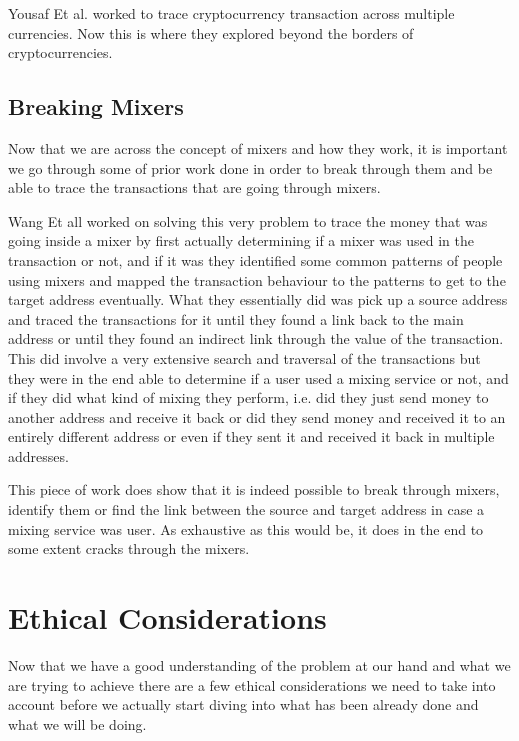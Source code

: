 \documentclass{article}
\begin{document}
        Yousaf Et al.\cite{tracing_transactions_across_cryptocurrency_ledgers_-_usenix} worked to trace cryptocurrency transaction across multiple currencies. Now this is where they explored beyond the borders of cryptocurrencies. 
        
\pagebreak

    \subsection{Breaking Mixers}
        Now that we are across the concept of mixers and how they work, it is important we go through some of prior work done in order to break through them and be able to trace the transactions that are going through mixers. 
        
        Wang Et all \cite{wang2022zero} worked on solving this very problem to trace the money that was going inside a mixer by first actually determining if a mixer was used in the transaction or not, and if it was they identified some common patterns of people using mixers and mapped the transaction behaviour to the patterns to get to the target address eventually. What they essentially did was pick up a source address and traced the transactions for it until they found a link back to the main address or until they found an indirect link through the value of the transaction. This did involve a very extensive search and traversal of the transactions but they were in the end able to determine if a user used a mixing service or not, and if they did what kind of mixing they perform, i.e. did they just send money to another address and receive it back or did they send money and received it to an entirely different address or even if they sent it and received it back in multiple addresses.
        
        This piece of work does show that it is indeed possible to break through mixers, identify them or find the link between the source and target address in case a mixing service was user. As exhaustive as this would be, it does in the end to some extent cracks through the mixers.
        
\pagebreak

\section{Ethical Considerations}

    Now that we have a good understanding of the problem at our hand and what we are trying to achieve there are a few ethical considerations we need to take into account before we actually start diving into what has been already done and what we will be doing.
\end{document}
